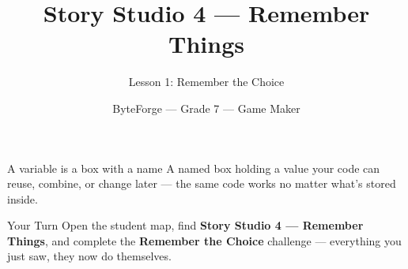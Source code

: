 \documentclass[aspectratio=169]{beamer}
\title{Story Studio 4 — Remember Things}
\subtitle{Lesson 1: Remember the Choice}
\author{ByteForge --- Grade 7 --- Game Maker}
\date{}
\begin{document}
\begin{frame}
    \titlepage
\end{frame}

\begin{frame}{A variable is a box with a name}
    \Large
    A named box holding a value your code can reuse, combine, or change later — the same code works no matter what's stored inside.

    \begin{center}
    \end{center}
\end{frame}

\begin{frame}{Your Turn}
    \Large
    Open the student map, find \textbf{Story Studio 4 — Remember Things}, and complete
    the \textbf{Remember the Choice} challenge --- everything you just saw, they now do themselves.
\end{frame}
\end{document}
